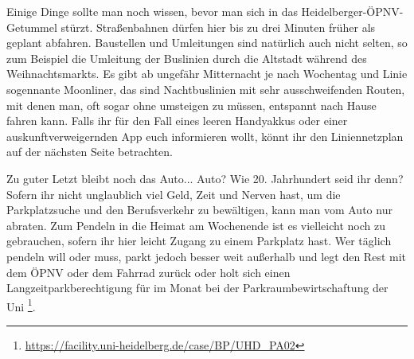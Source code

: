 Einige Dinge sollte man noch wissen, bevor man sich in das Heidelberger-ÖPNV-Getummel stürzt. Straßenbahnen dürfen hier bis zu drei Minuten früher als geplant abfahren. Baustellen und Umleitungen sind natürlich auch nicht selten, so zum Beispiel die Umleitung der Buslinien durch die Altstadt während des Weihnachtsmarkts. Es gibt ab ungefähr Mitternacht je nach Wochentag und Linie sogennante Moonliner, das sind Nachtbuslinien mit sehr ausschweifenden Routen, mit denen man, oft sogar ohne umsteigen zu müssen, entspannt nach Hause fahren kann. Falls ihr für den Fall eines leeren Handyakkus oder einer auskunftverweigernden App euch informieren wollt, könnt ihr den Liniennetzplan auf der nächsten Seite betrachten.




Zu guter Letzt bleibt noch das Auto... Auto? Wie 20. Jahrhundert seid ihr denn? Sofern ihr nicht unglaublich viel Geld, Zeit und Nerven hast, um die Parkplatzsuche und den Berufsverkehr zu bewältigen, kann man vom Auto nur abraten. Zum Pendeln in die Heimat am Wochenende ist es vielleicht noch zu gebrauchen, sofern ihr hier leicht Zugang zu einem Parkplatz hast. Wer täglich pendeln will oder muss, parkt jedoch besser weit außerhalb und legt den Rest mit dem ÖPNV oder dem Fahrrad zurück oder holt sich einen Langzeitparkberechtigung für  im Monat bei der Parkraumbewirtschaftung der Uni \footnote{\url{https://facility.uni-heidelberg.de/case/BP/UHD_PA02}}.




\onecolumn


\twocolumn
